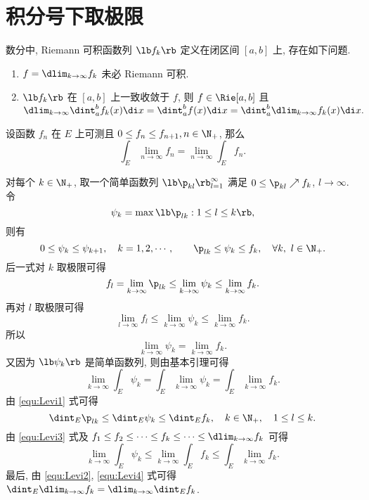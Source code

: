 \documentclass[UTF8, a4paper, 12pt, twoside, onecolumn]{book}
\begin{document}
\section{积分号下取极限}

数分中, Riemann 可积函数列 $\lb f_k \rb$ 定义在闭区间 $[a, b]$ 上, 存在如下问题.
\begin{enumerate}
	\item $f = \dlim_{k \to \infty} f_k$ 未必 Riemann 可积.
	\item $\lb f_k \rb$ 在 $[a, b]$ 上一致收敛于 $f$, 则 $f \in \Rie[a, b]$ 且 $\dlim_{k \to \infty} \dint_{a}^{b} f_k(x) \di x = \dint_{a}^{b} f(x) \di x = \dint_{a}^{b} \dlim_{k \to \infty} f_k(x) \di x.$
\end{enumerate}

\begin{Theorem}
	设函数 $f_n$ 在 $E$ 上可测且 $0 \leq f_n \leq f_{n + 1}, n \in \N_+$, 那么
	$$\int_E \lim_{n \to \infty} f_n = \lim_{n \to \infty} \int_E f_n.$$
\end{Theorem}

\begin{Proof}
	对每个 $k \in \N_+$, 取一个简单函数列 $\lb \p_{kl} \rb_{l = 1}^{\infty}$ 满足 $0 \leq \p_{kl} \nearrow f_k$, $l \to \infty$. 令
	$$\psi_k = \max\lb \p_{lk} : 1 \leq l \leq k \rb,$$
	则有
	\begin{equation}\label{equ:Levi1}
		0 \leq \psi_k \leq \psi_{k + 1},\quad k = 1, 2, \cdots,\qquad \p_{lk} \leq \psi_k \leq f_k,\quad \forall k,~l \in \N_+.
	\end{equation}
	后一式对 $k$ 取极限可得
	$$f_l = \lim_{k \to \infty} \p_{lk} \leq \lim_{k \to \infty} \psi_k \leq \lim_{k \to \infty}f_k.$$
	再对 $l$ 取极限可得
	$$\lim_{l \to \infty} f_l \leq \lim_{k \to \infty} \psi_k \leq \lim_{k \to \infty}f_k.$$
	所以
	$$\lim_{k \to \infty} \psi_k = \lim_{k \to \infty} f_k.$$
	又因为 $\lb \psi_k \rb$ 是简单函数列, 则由基本引理可得
	\begin{equation}\label{equ:Levi2}
		\lim_{k \to \infty} \int_E \psi_k = \int_{E} \lim_{k \to \infty} \psi_k = \int_E \lim_{k \to \infty} f_k.
	\end{equation}
	由 \eqref{equ:Levi1} 式可得
	\begin{equation}\label{equ:Levi3}
		\dint_E \p_{lk} \leq \dint_E \psi_k \leq \dint_E f_k,\quad k \in \N_+,\quad 1 \leq l \leq k.
	\end{equation}
	由 \eqref{equ:Levi3} 式及 $f_1 \leq f_2 \leq \cdots \leq f_k \leq \cdots \leq \dlim_{k \to \infty} f_k$ 可得
	\begin{equation}\label{equ:Levi4}
		\lim_{k \to \infty} \int_E \psi_k \leq \lim_{k \to \infty} \int_E f_k \leq \int_E \lim_{k \to \infty} f_k.
	\end{equation}
	最后, 由 \eqref{equ:Levi2}, \eqref{equ:Levi4} 式可得 $\dint_E \dlim_{k \to \infty} f_k = \dlim_{k \to \infty} \dint_E f_k$.
\end{Proof}
\end{document}
